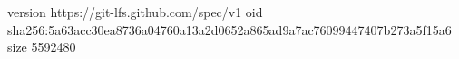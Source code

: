 version https://git-lfs.github.com/spec/v1
oid sha256:5a63acc30ea8736a04760a13a2d0652a865ad9a7ac76099447407b273a5f15a6
size 5592480
